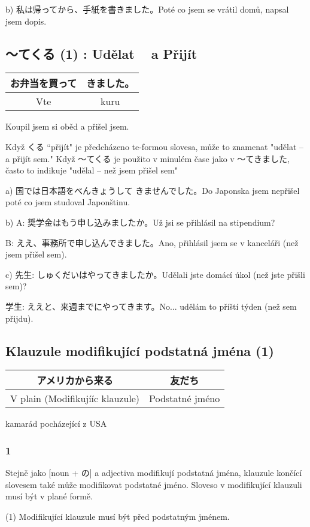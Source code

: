 b) 私は帰ってから、手紙を書きました。Poté co jsem se vrátil domů, napsal jsem dopis.

\subsection{ 〜てくる (1) : Udělat ~ a Přijít}
\begin{tabular}{|c|c|}
\hline
お弁当を買って&きました。\\
\hline
Vte&kuru\\
\hline
\end{tabular}
Koupil jsem si oběd a přišel jsem.


Když くる “přijít"  je předcházeno te-formou slovesa, může to znamenat "udělat -- a přijít sem." Když 〜てくる je použito v minulém čase jako v 〜てきました, často to indikuje "udělal -- než jsem přišel sem"


a) 国では日本語をべんきょうして きませんでした。Do Japonska jsem nepřišel poté co jsem studoval Japonštinu.

b) 
A: 奨学金はもう申し込みましたか。Už jsi se přihlásil na stipendium?

B: ええ、事務所で申し込んできました。Ano, přihlásil jsem se v kanceláři (než jsem přišel sem).

c) 
先生: しゅくだいはやってきましたか。Udělali jste domácí úkol (než jste přišli sem)?

学生: ええと、来週までにやってきます。No... udělám to příští týden (než sem přijdu).

\subsection{ Klauzule modifikující podstatná jména (1)}
\begin{tabular}{|c|c|}
アメリカから来る&友だち\\
\hline
V plain (Modifikujííc klauzule)&Podstatné jméno\\
\hline
\end{tabular}
kamarád pocházející z USA

\subsubsection{1}
Stejně jako [noun + の] a adjectiva modifikují podstatná jména, klauzule končící slovesem také může modifikovat podstatné jméno. Sloveso v modifikující klauzuli musí být v plané formě. 

(1) Modifikující klauzule musí být před podstatným jménem.

